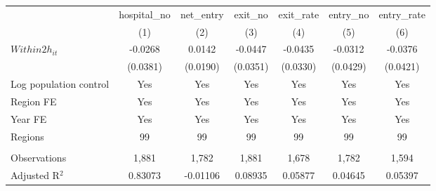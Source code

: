 \begingroup
\centering
\begin{tabular}{lcccccc}
   \toprule
                          & hospital\_no  & net\_entry  & exit\_no  & exit\_rate  & entry\_no  & entry\_rate \\    
                          & (1)           & (2)         & (3)       & (4)         & (5)        & (6)\\  
   \midrule 
   $Within2h_{it}$        & -0.0268       & 0.0142      & -0.0447   & -0.0435     & -0.0312    & -0.0376\\   
                          & (0.0381)      & (0.0190)    & (0.0351)  & (0.0330)    & (0.0429)   & (0.0421)\\   
   Log population control & Yes           & Yes         & Yes       & Yes         & Yes        & Yes\\  
   Region FE              & Yes           & Yes         & Yes       & Yes         & Yes        & Yes\\  
   Year FE                & Yes           & Yes         & Yes       & Yes         & Yes        & Yes\\  
   Regions                & 99            & 99          & 99        & 99          & 99         & 99\\  
    \\
   Observations           & 1,881         & 1,782       & 1,881     & 1,678       & 1,782      & 1,594\\  
   Adjusted R$^2$         & 0.83073       & -0.01106    & 0.08935   & 0.05877     & 0.04645    & 0.05397\\  
   \bottomrule
\end{tabular}
\par\endgroup
